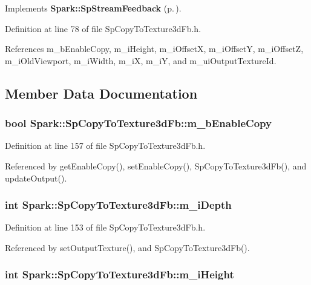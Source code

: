 Implements {\bf Spark::Sp\-Stream\-Feedback} {\rm (p.\,\pageref{classSpark_1_1SpStreamFeedback_a1})}.

Definition at line 78 of file Sp\-Copy\-To\-Texture3d\-Fb.h.

References m\_\-b\-Enable\-Copy, m\_\-i\-Height, m\_\-i\-Offset\-X, m\_\-i\-Offset\-Y, m\_\-i\-Offset\-Z, m\_\-i\-Old\-Viewport, m\_\-i\-Width, m\_\-i\-X, m\_\-i\-Y, and m\_\-ui\-Output\-Texture\-Id.

\subsection{Member Data Documentation}
\subsubsection{\setlength{\rightskip}{0pt plus 5cm}bool {\bf Spark::Sp\-Copy\-To\-Texture3d\-Fb::m\_\-b\-Enable\-Copy}\hspace{0.3cm}{\tt  [protected]}}\label{classSpark_1_1SpCopyToTexture3dFb_p10}


Definition at line 157 of file Sp\-Copy\-To\-Texture3d\-Fb.h.

Referenced by get\-Enable\-Copy(), set\-Enable\-Copy(), Sp\-Copy\-To\-Texture3d\-Fb(), and update\-Output().
\subsubsection{\setlength{\rightskip}{0pt plus 5cm}int {\bf Spark::Sp\-Copy\-To\-Texture3d\-Fb::m\_\-i\-Depth}\hspace{0.3cm}{\tt  [protected]}}\label{classSpark_1_1SpCopyToTexture3dFb_p8}


Definition at line 153 of file Sp\-Copy\-To\-Texture3d\-Fb.h.

Referenced by set\-Output\-Texture(), and Sp\-Copy\-To\-Texture3d\-Fb().
\subsubsection{\setlength{\rightskip}{0pt plus 5cm}int {\bf Spark::Sp\-Copy\-To\-Texture3d\-Fb::m\_\-i\-Height}\hspace{0.3cm}{\tt  [protected]}}\label{classSpark_1_1SpCopyToTexture3dFb_p7}


